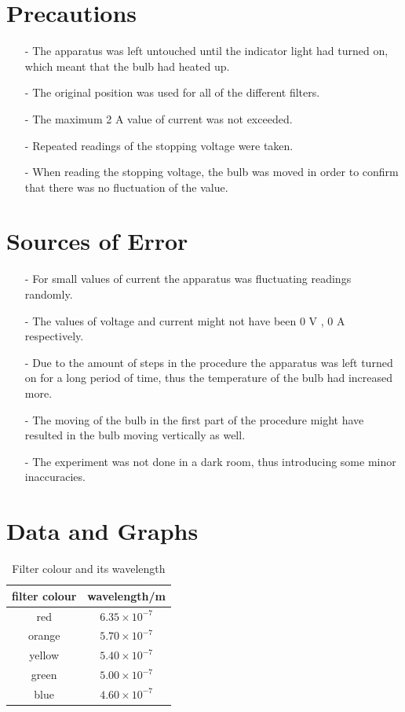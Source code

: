 \documentclass[12pt, a4paper]{article}
\begin{document}
\section*{Precautions}
\begin{itemize}
    \item[-] The apparatus was left untouched until the indicator light had turned on, which meant that the bulb had heated up.
    \item[-] The original position was used for all of the different filters.
    \item[-] The maximum 2 \textmu A value of current was not exceeded. 
    \item[-] Repeated readings of the stopping voltage were taken.
    \item[-] When reading the stopping voltage, the bulb was moved in order to confirm that there was no fluctuation of the value.
\end{itemize}

\section*{Sources of Error}
\begin{itemize}
    \item[-] For small values of current the apparatus was fluctuating readings randomly.
    \item[-] The values of voltage and current might not have been 0 V , 0 \textmu A respectively.
    \item[-] Due to the amount of steps in the procedure the apparatus was left turned on for a long period of time, thus the temperature of the bulb had increased more.
    \item[-] The moving of the bulb in the first part of the procedure might have resulted in the bulb moving vertically as well.
    \item[-] The experiment was not done in a dark room, thus introducing some minor inaccuracies.
\end{itemize}

\section*{Data and Graphs}
\begin{longtable}{|c|c|}
\caption{Filter colour and its wavelength}
\label{tab:Table 1}\\ \hline
filter colour & wavelength/m    \\ \hline
\endfirsthead

\endhead

red     & $6.35\times10^{-7}$ \\ \hline
orange  & $5.70\times10^{-7}$ \\ \hline
yellow  & $5.40\times10^{-7}$ \\ \hline
green   & $5.00\times10^{-7}$ \\ \hline
blue    & $4.60\times10^{-7}$ \\ \hline
\end{longtable}
\end{document}
